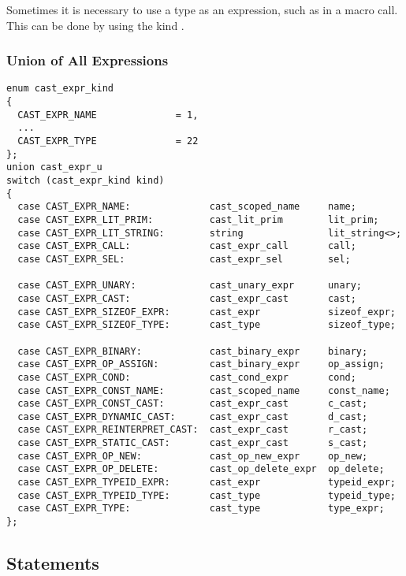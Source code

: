 Sometimes it is necessary to use a type as an expression, such as in a macro
call.  This can be done by using the kind .

\subsubsection{Union of All Expressions}

\begin{verbatim}
enum cast_expr_kind
{
  CAST_EXPR_NAME              = 1,
  ...
  CAST_EXPR_TYPE              = 22
};
union cast_expr_u
switch (cast_expr_kind kind)
{
  case CAST_EXPR_NAME:              cast_scoped_name     name;
  case CAST_EXPR_LIT_PRIM:          cast_lit_prim        lit_prim;
  case CAST_EXPR_LIT_STRING:        string               lit_string<>;
  case CAST_EXPR_CALL:              cast_expr_call       call;
  case CAST_EXPR_SEL:               cast_expr_sel        sel;

  case CAST_EXPR_UNARY:             cast_unary_expr      unary;
  case CAST_EXPR_CAST:              cast_expr_cast       cast;
  case CAST_EXPR_SIZEOF_EXPR:       cast_expr            sizeof_expr;
  case CAST_EXPR_SIZEOF_TYPE:       cast_type            sizeof_type;

  case CAST_EXPR_BINARY:            cast_binary_expr     binary;
  case CAST_EXPR_OP_ASSIGN:         cast_binary_expr     op_assign;
  case CAST_EXPR_COND:              cast_cond_expr       cond;
  case CAST_EXPR_CONST_NAME:        cast_scoped_name     const_name;
  case CAST_EXPR_CONST_CAST:        cast_expr_cast       c_cast;
  case CAST_EXPR_DYNAMIC_CAST:      cast_expr_cast       d_cast;
  case CAST_EXPR_REINTERPRET_CAST:  cast_expr_cast       r_cast;
  case CAST_EXPR_STATIC_CAST:       cast_expr_cast       s_cast;
  case CAST_EXPR_OP_NEW:            cast_op_new_expr     op_new;
  case CAST_EXPR_OP_DELETE:         cast_op_delete_expr  op_delete;
  case CAST_EXPR_TYPEID_EXPR:       cast_expr            typeid_expr;
  case CAST_EXPR_TYPEID_TYPE:       cast_type            typeid_type;
  case CAST_EXPR_TYPE:              cast_type            type_expr;
};
\end{verbatim}



\subsection{Statements}
\label{subsec:CAST:Statements}

